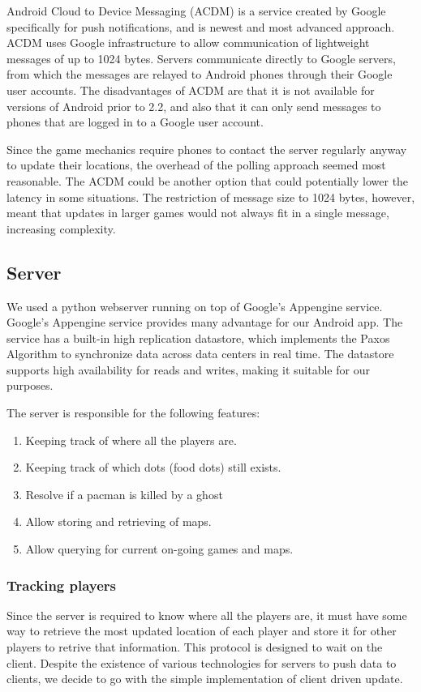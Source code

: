 \documentclass{acm_proc_article-sp}
\begin{document}
Android Cloud to Device Messaging (ACDM) is a service created by Google
specifically for push notifications, and is newest and most advanced approach.
ACDM uses Google infrastructure to allow communication of lightweight messages
of up to 1024 bytes. Servers communicate directly to Google servers, from which
the messages are relayed to Android phones through their Google user accounts.
The disadvantages of ACDM are that it is not available for versions of Android
prior to 2.2, and also that it can only send messages to phones that are logged
in to a Google user account.

Since the game mechanics require phones to contact the server regularly anyway
to update their locations, the overhead of the polling approach seemed most
reasonable. The ACDM could be another option that could potentially lower the
latency in some situations. The restriction of message size to 1024 bytes,
however, meant that updates in larger games would not always fit in a single
message, increasing complexity.


\subsection{Server}

We used a python webserver running on top of Google's Appengine
service. Google's Appengine service provides many advantage for our
Android app. The service has a built-in high replication datastore,
which implements the Paxos Algorithm to synchronize data across data
centers in real time. The datastore supports high availability for
reads and writes, making it suitable for our purposes.

The server is responsible for the following features:

\begin{enumerate}
\item Keeping track of where all the players are.
\item Keeping track of which dots (food dots) still exists.
\item Resolve if a pacman is killed by a ghost
\item Allow storing and retrieving of maps.
\item Allow querying for current on-going games and maps.
\end{enumerate}

\subsubsection{Tracking players}
Since the server is required to know where all the players are, it
must have some way to retrieve the most updated location of each
player and store it for other players to retrive that
information. This protocol is designed to wait on the client. Despite
the existence of various technologies for servers to push data to
clients, we decide to go with the simple implementation of client
driven update.
\end{document}
